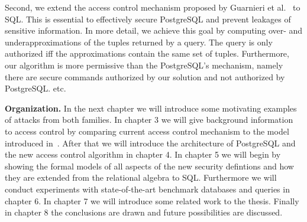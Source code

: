 Second, we extend the access control mechanism proposed by Guarnieri et al.~\cite{guarnieri2016strong} to SQL.
%
This is essential to effectively secure PostgreSQL and prevent leakages of sensitive information.
%
In more detail, we achieve this goal by computing over- and underapproximations of the tuples returned by a query. The query is only authorized iff the approximations contain the same set of tuples.
%
%
Furthermore, our algorithm is  more permissive than the PostgreSQL's mechanism, namely there are secure commands authorized by our solution and not authorized by PostgreSQL. etc.  

\smallskip
\noindent
{\bf Organization.}
%
In the next chapter we will introduce some motivating examples of attacks from both families. 
%
In chapter 3 we will give background information to access control by comparing current access control mechanism to the model introduced in~\cite{guarnier2016strong}.
%
After that we will introduce the architecture of PostgreSQL and the new access control algorithm in chapter 4. 
%
In chapter 5 we will begin by showing the formal models of all aspects of the new security defintions and how they are extended from the relational algebra to SQL. 
%
Furthermore we will conduct experiments with state-of-the-art benchmark databases and queries in chapter 6. 
%
In chapter 7 we will introduce some related work to the thesis. 
%
Finally in chapter 8 the conclusions are drawn and future possibilities are discussed.